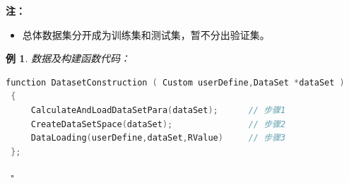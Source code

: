 \documentclass[UTF-8]{progbookcn}
\newtheorem{example}{例}[chapter]         %
\begin{document}
\begin{table}[!h]
\centering
\caption{数据集构建相关函数}
\end{table}
\noindent\textbf{注：}
\begin{itemize}
  \item 总体数据集分开成为训练集和测试集，暂不分出验证集。
\end{itemize}

\begin{example}
数据及构建函数代码：
\begin{lstlisting}[language=C,caption={函数 5 DatasetConstruction}]
  function DatasetConstruction ( Custom userDefine,DataSet *dataSet )
 {
     CalculateAndLoadDataSetPara(dataSet);      // 步骤1
     CreateDataSetSpace(dataSet);               // 步骤2
     DataLoading(userDefine,dataSet,RValue)     // 步骤3
 };
\end{lstlisting}~\hfill$\square$
\end{example}
\end{document}
